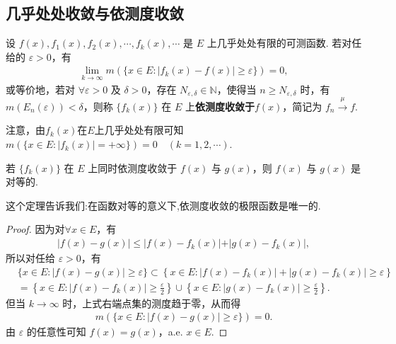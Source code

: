 \documentclass[../../main.tex]{subfiles}%
\begin{document}
\subsection{几乎处处收敛与依测度收敛}

\begin{definition}
设 $f(x),f_1(x),f_2(x),\cdots,f_k(x),\cdots$ 是 $E$ 上几乎处处有限的可测函数. 若对任给的 $\varepsilon>0$，有
\begin{align}
\lim_{k\to\infty}m(\{x\in E:\vert f_k(x)-f(x)\vert \geqslant \varepsilon\}) = 0,\label{eq:3.7}
\end{align}
或等价地，若对 $\forall\varepsilon > 0$ 及 $\delta > 0$，存在 $N_{\varepsilon,\delta}\in\mathbb{N}$，使得当 $n\geqslant N_{\varepsilon,\delta}$ 时，有 $m(E_n(\varepsilon)) < \delta$，则称 $\{f_k(x)\}$ 在 $E$ 上\textbf{依测度收敛于}$f(x)$，简记为 $f_n\stackrel{\mu}{\longrightarrow}f$. 
\end{definition}
\begin{remark}
注意，由$f_k(x)$在$E$上几乎处处有限可知$m(\{x\in E:\vert f_k(x)\vert=+\infty\}) = 0\quad (k = 1,2,\cdots)$. 
\end{remark}

\begin{theorem}\label{theorem:依测度收敛的极限函数必唯一}
若 $\{f_k(x)\}$ 在 $E$ 上同时依测度收敛于 $f(x)$ 与 $g(x)$，则 $f(x)$ 与 $g(x)$ 是对等的.
\end{theorem}
\begin{note}
这个定理告诉我们:在函数对等的意义下,依测度收敛的极限函数是唯一的.
\end{note}
\begin{proof}
因为对$\forall x\in E$，有
\begin{align*}
\vert f(x)-g(x)\vert\leqslant\vert f(x)-f_k(x)\vert+\vert g(x)-f_k(x)\vert,
\end{align*}
所以对任给 $\varepsilon>0$，有
\begin{align*}
&\{x\in E:\left| f(x)-g(x) \right|\geqslant \varepsilon \}\subset \left\{ x\in E:\left| f\left( x \right) -f_k\left( x \right) \right|+\left| g\left( x \right) -f_k\left( x \right) \right|\geqslant \varepsilon \right\} 
\\
&=\left\{ x\in E:\left| f(x)-f_k(x) \right|\geqslant \frac{\varepsilon}{2} \right\} \cup \left\{ x\in E:\left| g(x)-f_k(x) \right|\geqslant \frac{\varepsilon}{2} \right\} .
\end{align*}
但当 $k\to\infty$ 时，上式右端点集的测度趋于零，从而得
\begin{align*}
m(\{x\in E:\vert f(x)-g(x)\vert\geqslant \varepsilon\}) = 0.
\end{align*}
由 $\varepsilon$ 的任意性可知 $f(x)=g(x)$，a.e. $x\in E$. 
\end{proof}
\end{document}
